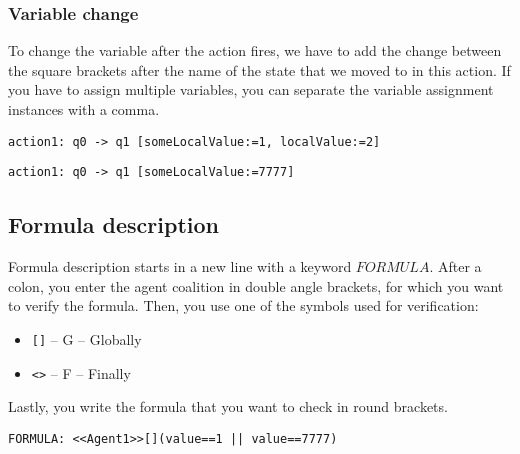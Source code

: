 \documentclass[12pt]{article}
\begin{document}
\subsubsection{Variable change}
To change the variable after the action fires, we have to add the change between the square brackets after the name of the state that we moved to in this action. If you have to assign multiple variables, you can separate the variable assignment instances with a comma.
\begin{lstlisting}[title={Action that sets the value of someLocalValue to 1 and localValue to 2.}]
  action1: q0 -> q1 [someLocalValue:=1, localValue:=2]
\end{lstlisting}
\begin{lstlisting}[title={Action that sets the value of someLocalValue to 7777.}]
  action1: q0 -> q1 [someLocalValue:=7777]
\end{lstlisting}

\subsection{Formula description}
Formula description starts in a new line with a keyword $FORMULA$. After a colon, you enter the agent coalition in double angle brackets, for which you want to verify the formula. Then, you use one of the symbols used for verification:
\begin{itemize}
  \item \verb+[]+ -- G -- Globally
  \item \verb+<>+ -- F -- Finally
\end{itemize}
Lastly, you write the formula that you want to check in round brackets.
\begin{lstlisting}[title={A formula that checks if there is a strategy that globally Agent1 could take such actions that the value will be always equal to 1 or 7777.}]
  FORMULA: <<Agent1>>[](value==1 || value==7777)
\end{lstlisting}
\end{document}
